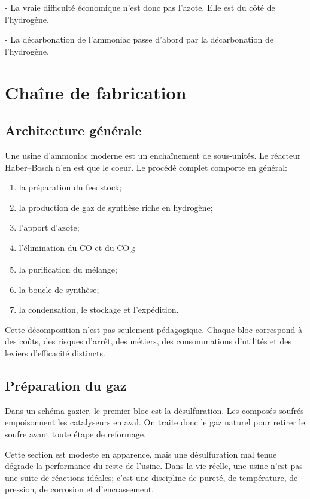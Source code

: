 \documentclass[11pt]{article}
\begin{document}
- La vraie difficulté économique n'est donc pas l'azote. Elle est du côté de l'hydrogène.

- La décarbonation de l'ammoniac passe d'abord par la décarbonation de l'hydrogène.

\section{Chaîne de fabrication}

\subsection{Architecture générale}

Une usine d'ammoniac moderne est un enchaînement de sous-unités. Le réacteur Haber--Bosch n'en est que le coeur. Le procédé complet comporte en général:

\begin{enumerate}[leftmargin=1.6em]
    \item la préparation du feedstock;
    \item la production de gaz de synthèse riche en hydrogène;
    \item l'apport d'azote;
    \item l'élimination du CO et du CO\textsubscript{2};
    \item la purification du mélange;
    \item la boucle de synthèse;
    \item la condensation, le stockage et l'expédition.
\end{enumerate}

Cette décomposition n'est pas seulement pédagogique. Chaque bloc correspond à des coûts, des risques d'arrêt, des métiers, des consommations d'utilités et des leviers d'efficacité distincts.

\subsection{Préparation du gaz}

Dans un schéma gazier, le premier bloc est la désulfuration. Les composés soufrés empoisonnent les catalyseurs en aval. On traite donc le gaz naturel pour retirer le soufre avant toute étape de reformage.

Cette section est modeste en apparence, mais une désulfuration mal tenue dégrade la performance du reste de l'usine. Dans la vie réelle, une usine n'est pas une suite de réactions idéales; c'est une discipline de pureté, de température, de pression, de corrosion et d'encrassement.
\end{document}
